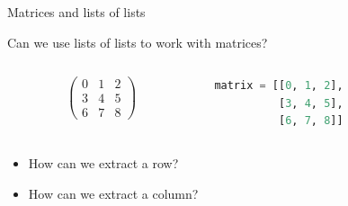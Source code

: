 \documentclass{beamer}
\newcommand\smiley{\textcolor{positive}{\DejaSans ☺}}
\newcommand\frownie{\textcolor{negative}{\DejaSans ☹}}
\begin{document}
\begin{frame}
 \begin{center}
 \end{center}
\end{frame}

\begin{frame}[fragile, t]{Matrices and lists of lists}
 
 \vspace{0.3truecm}
 Can we use lists of lists to work with matrices?

 \begin{columns}
  \begin{column}{0.4\textwidth}
   \begin{displaymath}
    \begin{pmatrix}
     0 & 1 & 2\\
     3 & 4 & 5\\
     6 & 7 & 8
    \end{pmatrix}
   \end{displaymath}
  \end{column}%
  \begin{column}{0.6\textwidth}
   \begin{center}
    \begin{lstlisting}[language=python]
matrix = [[0, 1, 2],
          [3, 4, 5],
          [6, 7, 8]]
    \end{lstlisting}

    \vspace{\baselineskip}
   \end{center}
  \end{column}
 \end{columns}
 \begin{itemize}
  \item How can we extract a row? \uncover<3>{\smiley}
  \item How can we extract a column? \uncover<3>{\frownie}
 \end{itemize}

 \vspace{0.3truecm}
 \begin{center}
 \end{center}
\end{frame}
\end{document}
